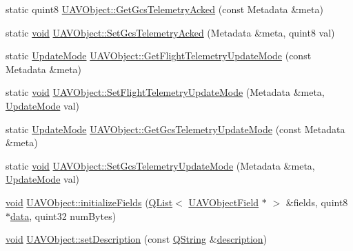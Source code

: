 \begin{DoxyCompactItemize}
\item 
static quint8 \hyperlink{group___u_a_v_objects_plugin_ga3bfcc38f5830eeea1369a6e7c3aa3214}{U\-A\-V\-Object\-::\-Get\-Gcs\-Telemetry\-Acked} (const Metadata \&meta)
\item 
static \hyperlink{group___u_a_v_objects_plugin_ga444cf2ff3f0ecbe028adce838d373f5c}{void} \hyperlink{group___u_a_v_objects_plugin_ga190e264f603dd8ade6b6f9e84debfb4c}{U\-A\-V\-Object\-::\-Set\-Gcs\-Telemetry\-Acked} (Metadata \&meta, quint8 val)
\item 
static \hyperlink{uavobjectparser_8h_af6f79ca652f5cd37cb76957fb76b1630}{Update\-Mode} \hyperlink{group___u_a_v_objects_plugin_ga6cd43aaa339c4bd8beead8988bb9f1a6}{U\-A\-V\-Object\-::\-Get\-Flight\-Telemetry\-Update\-Mode} (const Metadata \&meta)
\item 
static \hyperlink{group___u_a_v_objects_plugin_ga444cf2ff3f0ecbe028adce838d373f5c}{void} \hyperlink{group___u_a_v_objects_plugin_gaa9fa161b9a5607e4ee1086b72f1b70e5}{U\-A\-V\-Object\-::\-Set\-Flight\-Telemetry\-Update\-Mode} (Metadata \&meta, \hyperlink{uavobjectparser_8h_af6f79ca652f5cd37cb76957fb76b1630}{Update\-Mode} val)
\item 
static \hyperlink{uavobjectparser_8h_af6f79ca652f5cd37cb76957fb76b1630}{Update\-Mode} \hyperlink{group___u_a_v_objects_plugin_ga81651b86ef2cf0b05483152c6728b742}{U\-A\-V\-Object\-::\-Get\-Gcs\-Telemetry\-Update\-Mode} (const Metadata \&meta)
\item 
static \hyperlink{group___u_a_v_objects_plugin_ga444cf2ff3f0ecbe028adce838d373f5c}{void} \hyperlink{group___u_a_v_objects_plugin_ga8fdb0f35b52c8dea0a512fd411d2346e}{U\-A\-V\-Object\-::\-Set\-Gcs\-Telemetry\-Update\-Mode} (Metadata \&meta, \hyperlink{uavobjectparser_8h_af6f79ca652f5cd37cb76957fb76b1630}{Update\-Mode} val)
\item 
\hyperlink{group___u_a_v_objects_plugin_ga444cf2ff3f0ecbe028adce838d373f5c}{void} \hyperlink{group___u_a_v_objects_plugin_ga7aa3a71a68a9190731f720ad0eb1c772}{U\-A\-V\-Object\-::initialize\-Fields} (\hyperlink{class_q_list}{Q\-List}$<$ \hyperlink{class_u_a_v_object_field}{U\-A\-V\-Object\-Field} $\ast$ $>$ \&fields, quint8 $\ast$\hyperlink{glext_8h_a8850df0785e6fbcc2351af3b686b8c7a}{data}, quint32 num\-Bytes)
\item 
\hyperlink{group___u_a_v_objects_plugin_ga444cf2ff3f0ecbe028adce838d373f5c}{void} \hyperlink{group___u_a_v_objects_plugin_ga9310ee9c9869110219a7fcd311aaaf28}{U\-A\-V\-Object\-::set\-Description} (const \hyperlink{group___u_a_v_objects_plugin_gab9d252f49c333c94a72f97ce3105a32d}{Q\-String} \&\hyperlink{sdlgamepad_8dox_ae82208d022e4246ddf1e4f481a3f81b0}{description})

\end{DoxyCompactItemize}
